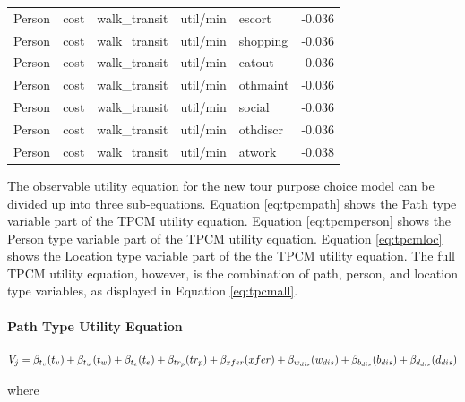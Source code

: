 \documentclass[3p, authoryear, review]{elsarticle} %
\begin{document}
\begin{table}
\begin{tabular}[t]{lllllr}
Person & cost & walk\_transit & util/min & escort & -0.036\\
Person & cost & walk\_transit & util/min & shopping & -0.036\\
\addlinespace
Person & cost & walk\_transit & util/min & eatout & -0.036\\
Person & cost & walk\_transit & util/min & othmaint & -0.036\\
Person & cost & walk\_transit & util/min & social & -0.036\\
Person & cost & walk\_transit & util/min & othdiscr & -0.036\\
Person & cost & walk\_transit & util/min & atwork & -0.038\\
\bottomrule
\end{tabular}
\end{table}

The observable utility equation for the new tour purpose choice model can be divided up into three sub-equations. Equation \eqref{eq:tpcmpath} shows the Path type variable part of the TPCM utility equation. Equation \eqref{eq:tpcmperson} shows the Person type variable part of the TPCM utility equation. Equation \eqref{eq:tpcmloc} shows the Location type variable part of the the TPCM utility equation. The full TPCM utility equation, however, is the combination of path, person, and location type variables, as displayed in Equation \eqref{eq:tpcmall}.

\hypertarget{path-type-utility-equation}{%
\paragraph{Path Type Utility Equation}\label{path-type-utility-equation}}

\begin{equation}
  V_j = \beta_{t_v}(t_v) + \beta_{t_w}(t_w) + \beta_{t_e}(t_e) + \beta_{tr_p}(tr_p) + \beta_{xfer}(xfer) + \beta_{w_{dis}}(w_{dis}) + \\ \beta_{b_{dis}}(b_{dis}) + \beta_{d_{dis}}(d_{dis}) \label{eq:tpcmpath}
\end{equation}

where
\end{document}
